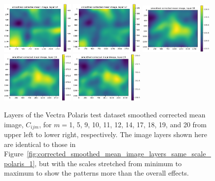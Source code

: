 \documentclass[letterpaper,11pt]{article}
\newcommand{\reffig}[1]{Figure~\ref{#1}}
\begin{document}
\begin{figure}[!ht]
\includegraphics[width=0.32\textwidth]{images/results/smoothed_corrected_mean_image_layers_polaris/smoothed_corrected_mean_image_layer_14}
\includegraphics[width=0.32\textwidth]{images/results/smoothed_corrected_mean_image_layers_polaris/smoothed_corrected_mean_image_layer_17}
\includegraphics[width=0.32\textwidth]{images/results/smoothed_corrected_mean_image_layers_polaris/smoothed_corrected_mean_image_layer_18}
\includegraphics[width=0.32\textwidth]{images/results/smoothed_corrected_mean_image_layers_polaris/smoothed_corrected_mean_image_layer_19}
\includegraphics[width=0.32\textwidth]{images/results/smoothed_corrected_mean_image_layers_polaris/smoothed_corrected_mean_image_layer_20}
\caption{\footnotesize Layers of the Vectra Polaris test dataset smoothed corrected mean image, $C_{ijm}$, for $m=$1, 5, 9, 10, 11, 12, 14, 17, 18, 19, and 20 from upper left to lower right, respectively. The image layers shown here are identical to those in \reffig{fig:corrected_smoothed_mean_image_layers_same_scale_polaris_1}, but with the scales stretched from minimum to maximum to show the patterns more than the overall effects.}
\label{fig:corrected_smoothed_mean_image_layers_polaris_1}
\end{figure}
\end{document}
